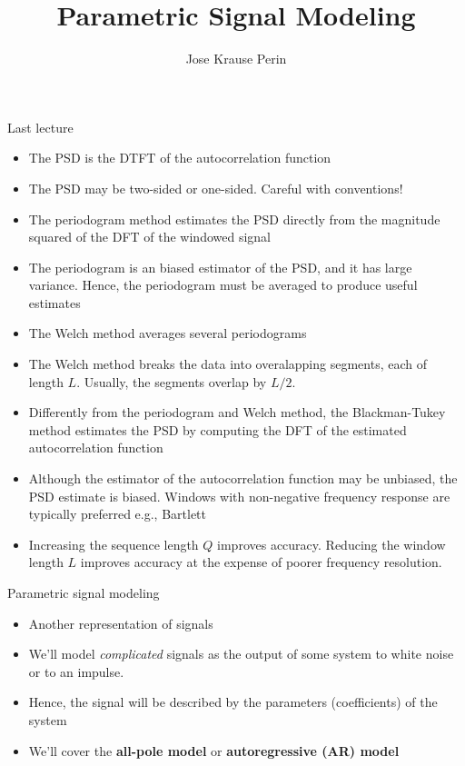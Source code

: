 \documentclass[10pt, aspectratio=169]{beamer}
\title[EE 264]{Parametric Signal Modeling}
\author{Jose Krause Perin}
\institute{Stanford University}
\begin{document}
\begin{frame}
  \titlepage
\end{frame}

%
\begin{frame}{Last lecture}
	\begin{itemize}
	\item The PSD is the DTFT of the autocorrelation function
	\item The PSD may be two-sided or one-sided. Careful with conventions!
	\item The periodogram method estimates the PSD directly from the magnitude squared of the DFT of the windowed signal
	\item The periodogram is an biased estimator of the PSD, and it has large variance. Hence, the periodogram must be averaged to produce useful estimates
	\item The Welch method averages several periodograms
	\item The Welch method breaks the data into overalapping segments, each of length $L$. Usually, the segments overlap by $L/2$.
	\item Differently from the periodogram and Welch method, the Blackman-Tukey method estimates the PSD by computing the DFT of the estimated autocorrelation function
	\item Although the estimator of the autocorrelation function may be unbiased, the PSD estimate is biased. Windows with non-negative frequency response are typically preferred e.g., Bartlett
	\item Increasing the sequence length $Q$ improves accuracy. Reducing the window length $L$ improves accuracy at the expense of poorer frequency resolution.
\end{itemize}
\end{frame}

%
\begin{frame}{Parametric signal modeling}
	\begin{itemize}
		\item Another representation of signals
		\item We'll model \textit{complicated} signals as the output of some system to white noise or to an impulse.
		\item Hence, the signal will be described by the parameters (coefficients) of the system
		\item We'll cover the \textbf{all-pole model} or \textbf{autoregressive (AR) model}
	\end{itemize}
\end{frame}
\end{document}
